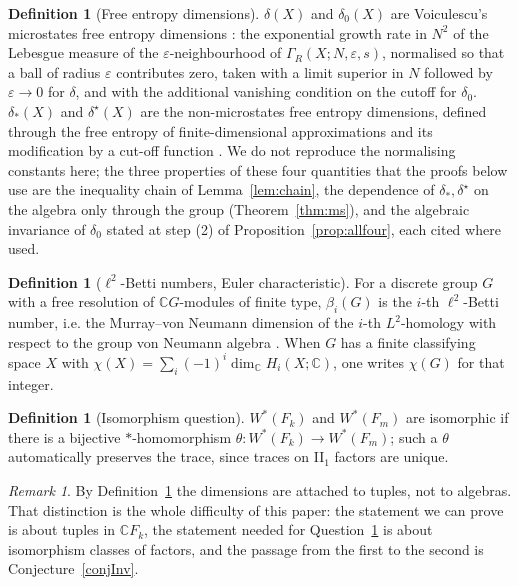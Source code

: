 \documentclass[11pt]{article}
\theoremstyle{plain}
\theoremstyle{definition}
\newtheorem{definition}[theorem]{Definition}
\theoremstyle{remark}
\newtheorem{remark}[theorem]{Remark}
\newcommand{\C}{\mathbb{C}}\newcommand{\N}{\mathbb{N}}
\begin{document}
\begin{definition}[Free entropy dimensions]\label{def:delta}
$\delta(X)$ and $\delta_0(X)$ are Voiculescu's microstates free entropy dimensions \cite{Voi94}: the exponential growth rate in $N^2$ of the Lebesgue measure of the $\varepsilon$-neighbourhood of $\Gamma_R(X;N,\varepsilon,s)$, normalised so that a ball of radius $\varepsilon$ contributes zero, taken with a limit superior in $N$ followed by $\varepsilon\to0$ for $\delta$, and with the additional vanishing condition on the cutoff for $\delta_0$. $\delta_*(X)$ and $\delta^\star(X)$ are the non-microstates free entropy dimensions, defined through the free entropy of finite-dimensional approximations and its modification by a cut-off function \cite{Voi94}. We do not reproduce the normalising constants here; the three properties of these four quantities that the proofs below use are the inequality chain of Lemma~\ref{lem:chain}, the dependence of $\delta_*,\delta^\star$ on the algebra only through the group (Theorem~\ref{thm:ms}), and the algebraic invariance of $\delta_0$ stated at step (2) of Proposition~\ref{prop:allfour}, each cited where used.
\end{definition}

\begin{definition}[$\ell^2$-Betti numbers, Euler characteristic]\label{def:betti}
For a discrete group $G$ with a free resolution of $\C G$-modules of finite type, $\beta_i(G)$ is the $i$-th $\ell^2$-Betti number, i.e. the Murray--von Neumann dimension of the $i$-th $L^2$-homology with respect to the group von Neumann algebra \cite{At76}. When $G$ has a finite classifying space $X$ with $\chi(X)=\sum_i(-1)^i\dim_\C H_i(X;\C)$, one writes $\chi(G)$ for that integer.
\end{definition}

\begin{definition}[Isomorphism question]\label{def:question}
$W^*(F_k)$ and $W^*(F_m)$ are isomorphic if there is a bijective $*$-homomorphism $\theta:W^*(F_k)\to W^*(F_m)$; such a $\theta$ automatically preserves the trace, since traces on II$_1$ factors are unique.
\end{definition}

\begin{remark}
By Definition~\ref{def:delta} the dimensions are attached to tuples, not to algebras. That distinction is the whole difficulty of this paper: the statement we can prove is about tuples in $\C F_k$, the statement needed for Question~\ref{def:question} is about isomorphism classes of factors, and the passage from the first to the second is Conjecture~\ref{conjInv}.
\end{remark}
\end{document}
